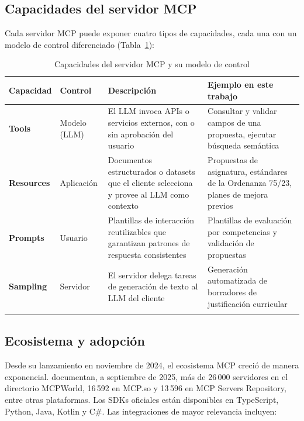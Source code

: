 \subsection{Capacidades del servidor MCP}

Cada servidor MCP puede exponer cuatro tipos de capacidades, cada una con un modelo de control diferenciado (Tabla~\ref{tab:mcp_capacidades}):

\begin{table}[!h]
\centering
\small
\setlength{\extrarowheight}{3pt}
\caption{Capacidades del servidor MCP y su modelo de control}
\label{tab:mcp_capacidades}
\begin{tabular}{p{2.2cm} p{2.4cm} p{7.0cm} p{3.1cm}}
\toprule
\textbf{Capacidad} & \textbf{Control} & \textbf{Descripción} & \textbf{Ejemplo en este trabajo} \\
\midrule
\textbf{Tools}
  & Modelo (LLM)
  & El LLM invoca APIs o servicios externos, con o sin aprobación del usuario
  & Consultar y validar campos de una propuesta, ejecutar búsqueda semántica \\
\arrayrulecolor{gray!35}\hline
\textbf{Resources}
  & Aplicación
  & Documentos estructurados o datasets que el cliente selecciona y provee al LLM como contexto
  & Propuestas de asignatura, estándares de la Ordenanza 75/23, planes de mejora previos \\
\hline
\textbf{Prompts}
  & Usuario
  & Plantillas de interacción reutilizables que garantizan patrones de respuesta consistentes
  & Plantillas de evaluación por competencias y validación de propuestas \\
\hline
\textbf{Sampling}
  & Servidor
  & El servidor delega tareas de generación de texto al LLM del cliente
  & Generación automatizada de borradores de justificación curricular \\
\arrayrulecolor{black}\bottomrule
\end{tabular}
\end{table}

\subsection{Ecosistema y adopción}

Desde su lanzamiento en noviembre de 2024, el ecosistema MCP creció de manera exponencial. \citet{hou2025model} documentan, a septiembre de 2025, más de 26\,000 servidores en el directorio MCPWorld, 16\,592 en MCP.so y 13\,596 en MCP Servers Repository, entre otras plataformas. Los SDKs oficiales están disponibles en TypeScript, Python, Java, Kotlin y C\#. Las integraciones de mayor relevancia incluyen:

